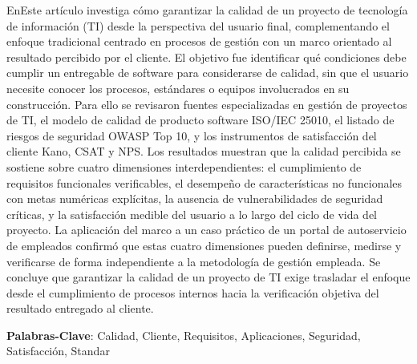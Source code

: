 \documentclass[
	article,			%
	11pt,				%
	oneside,			%
	a4paper,			%
	english,			%
	brazil,				%
	sumario=tradicional
	]{abntex2}
\begin{document}
\frenchspacing 


%
%
\maketitle
\begin{columnaderesumen}
EnEste artículo investiga cómo garantizar la calidad de un proyecto de tecnología de información (TI) desde la perspectiva del usuario final, complementando el enfoque tradicional centrado en procesos de gestión con un marco orientado al resultado percibido por el cliente. El objetivo fue identificar qué condiciones debe cumplir un entregable de software para considerarse de calidad, sin que el usuario necesite conocer los procesos, estándares o equipos involucrados en su construcción. Para ello se revisaron fuentes especializadas en gestión de proyectos de TI, el modelo de calidad de producto software ISO/IEC 25010, el listado de riesgos de seguridad OWASP Top 10, y los instrumentos de satisfacción del cliente Kano, CSAT y NPS. Los resultados muestran que la calidad percibida se sostiene sobre cuatro dimensiones interdependientes: el cumplimiento de requisitos funcionales verificables, el desempeño de características no funcionales con metas numéricas explícitas, la ausencia de vulnerabilidades de seguridad críticas, y la satisfacción medible del usuario a lo largo del ciclo de vida del proyecto.
La aplicación del marco a un caso práctico de un portal de autoservicio de empleados confirmó que estas cuatro dimensiones pueden definirse, medirse y verificarse de forma independiente a la metodología de gestión empleada. Se concluye que garantizar la calidad de un proyecto de TI exige trasladar el enfoque desde el cumplimiento de procesos internos hacia la verificación objetiva del resultado entregado al cliente.

 
 \vspace{\onelineskip}
 
 \noindent
 \textbf{Palabras-Clave}: Calidad, Cliente, Requisitos, Aplicaciones, Seguridad, Satisfacción, Standar
\end{columnaderesumen}
\end{document}
